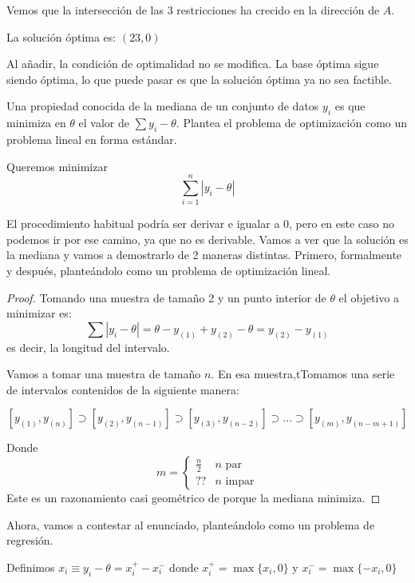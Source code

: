 \begin{problem}[5]
Vemos que la intersección de las 3 restricciones ha crecido en la dirección de $A$.

La solución óptima es: $\left(23,0\right)$


\obs Al añadir, la condición de optimalidad no se modifica.
%
La base óptima sigue siendo óptima, lo que puede pasar es que la solución óptima ya no sea factible.

\end{problem}


\begin{problem}[9]

Una propiedad conocida de la mediana de un conjunto de datos $y_i$ es que minimiza en $\theta$ el valor de $\sum y_i-\theta$.
%
Plantea el problema de optimización como un problema lineal en forma estándar.
\solution

Queremos minimizar
\[\sum_{i=1}^n |y_i - \theta|\]

El procedimiento habitual podría ser derivar e igualar a 0, pero en este caso no podemos ir por ese camino, ya que no es derivable.
Vamos a ver que la solución es la mediana y vamos a demostrarlo de 2 maneras distintas.
Primero, formalmente y después, planteándolo como un problema de optimización lineal.

\begin{proof}

Tomando una muestra de tamaño 2 y un punto interior de $\theta$ el objetivo a minimizar es:
\[\sum |y_i - \theta| = \theta - y_{(1)} + y_{(2)}-\theta = y_{(2)} - y_{(1)}\]
es decir, la longitud del intervalo.

Vamos a tomar una muestra de tamaño $n$.
En esa muestra,tTomamos una serie de intervalos contenidos de la siguiente manera:

\[ [y_{(1)},y_{(n)}] \supset  [y_{(2)},y_{(n-1)}] \supset [y_{(3)},y_{(n-2)}] \supset ... \supset [y_{(m)},y_{(n-m+1)}]\]

Donde \[m=\left\{ \begin{array}{cc} \frac{n}{2} & n\text{ par}\\ ?? & n\text{ impar} \end{array}\right.\]
Este es un razonamiento casi geométrico de porque la mediana minimiza.
\end{proof}


Ahora, vamos a contestar al enunciado, planteándolo como un problema de regresión.

Definimos $x_i \equiv y_i - \theta = x_i^+ - x_i^-$ donde $x_i^+ = \max\{x_i,0\}$ y $x_i^- = \max\{-x_i,0\}$


\end{problem}
